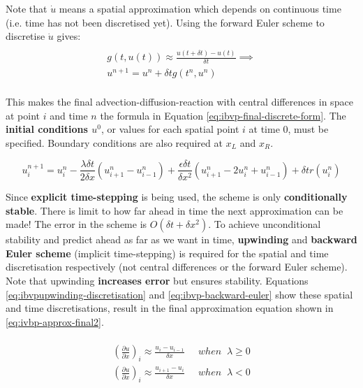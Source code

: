\documentclass{article}
\begin{document}
Note that $\dot{u}$ means a spatial approximation which depends on continuous time (i.e. time has not been discretised yet). Using the forward Euler scheme to discretise $\dot{u}$ gives:
\begin{multline}\\
	g(t, u(t)) \approx \frac{u(t + \delta t) - u(t)}{\delta t} \implies \\
	u^{n+1} = u^n + \delta t g(t^n, u^n) \\
\end{multline}

This makes the final advection-diffusion-reaction with central differences in space at point $i$ and time $n$ the formula in Equation \ref{eq:ibvp-final-discrete-form}. The \textbf{initial conditions $u^0$}, or values for each spatial point $i$ at time $0$, must be specified. Boundary conditions are also required at $x_L$ and $x_R$.

\begin{equation}
	u_i^{n+1} = u_i^n - \frac{\lambda \delta t}{2 \delta x}(u_{i+1}^n - u_{i-1}^n) + \frac{\epsilon \delta t}{\delta x^2}(u_{i+1}^n - 2u_i^n + u_{i-1}^n) + \delta tr(u_i^n)
	\label{eq:ibvp-final-discrete-form}
\end{equation}

Since \textbf{explicit time-stepping} is being used, the scheme is only \textbf{conditionally stable}. There is limit to how far ahead in time the next approximation can be made! The error in the scheme is $O(\delta t + \delta x^2)$. To achieve unconditional stability and predict ahead as far as we want in time, \textbf{upwinding} and \textbf{backward Euler scheme} (implicit time-stepping) is required for the spatial and time discretisation respectively (not central differences or the forward Euler scheme). Note that upwinding \textbf{increases error} but ensures stability. Equations \ref{eq:ibvpupwinding-discretisation} and \ref{eq:ibvp-backward-euler} show these spatial and time discretisations, result in the final approximation equation shown in \ref{eq:ivbp-approx-final2}.

\begin{multline}\\
	{\left( \frac{\partial u}{\partial x} \right)}_i \approx \frac{u_i - u_{i - 1}}{\delta x} \;\;\;\;\; when \;\; \lambda \geq 0 \\
	{\left( \frac{\partial u}{\partial x} \right)}_i \approx \frac{u_{i+1} - u_{i}}{\delta x} \;\;\;\;\; when \;\; \lambda < 0 \\
	\label{eq:ibvpupwinding-discretisation}
\\ \end{multline}
\end{document}
